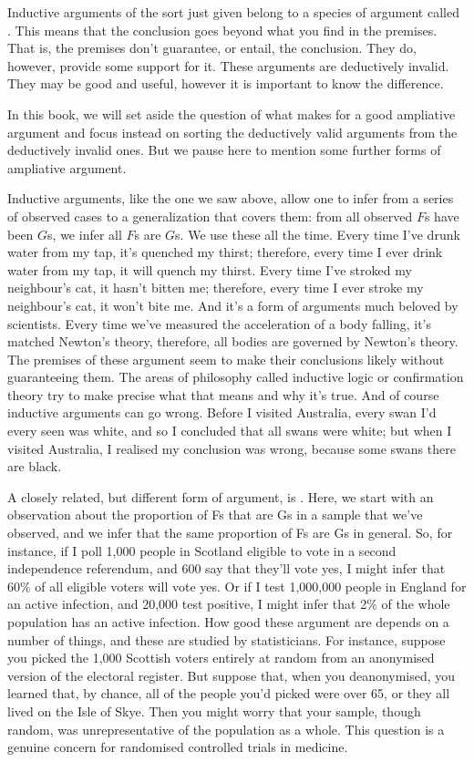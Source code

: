 Inductive arguments of the sort just given belong to a species of argument called . This means that the conclusion goes beyond what you find in the premises. That is, the premises don't guarantee, or entail, the conclusion. They do, however, provide some support for it. These arguments are deductively invalid. They may be good and useful, however it is important to know the difference.

In this book, we will set aside the question of what makes for a good ampliative argument and focus instead on sorting the deductively valid arguments from the deductively invalid ones.
But we pause here to mention some further forms of ampliative argument.

Inductive arguments, like the one we saw above, allow one to infer from a series of observed cases to a generalization that covers them: from all observed $F$s have been $G$s, we infer all $F$s are $G$s. We use these all the time. Every time I've drunk water from my tap, it's quenched my thirst; therefore, every time I ever drink water from my tap, it will quench my thirst. Every time I've stroked my neighbour's cat, it hasn't bitten me; therefore, every time I ever stroke my neighbour's cat, it won't bite me. And it's a form of arguments much beloved by scientists. Every time we've measured the acceleration of a body falling, it's matched Newton's theory, therefore, all bodies are governed by Newton's theory. The premises of these argument seem to make their conclusions likely without guaranteeing them. The areas of philosophy called inductive logic or confirmation theory try to make precise what that means and why it's true. And of course inductive arguments can go wrong. Before I visited Australia, every swan I'd every seen was white, and so I concluded that all swans were white; but when I visited Australia, I realised my conclusion was wrong, because some swans there are black.

A closely related, but different form of argument, is . Here, we start with an observation about the proportion of Fs that are Gs in a sample that we've observed, and we infer that the same proportion of Fs are Gs in general. So, for instance, if I poll 1,000 people in Scotland eligible to vote in a second independence referendum, and 600 say that they'll vote yes, I might infer that 60\% of all eligible voters will vote yes. Or if I test 1,000,000 people in England for an active infection, and 20,000 test positive, I might infer that 2\% of the whole population has an active infection. How good these argument are depends on a number of things, and these are studied by statisticians. For instance, suppose you picked the 1,000 Scottish voters entirely at random from an anonymised version of the electoral register. But suppose that, when you deanonymised, you learned that, by chance, all of the people you'd picked were over 65, or they all lived on the Isle of Skye. Then you might worry that your sample, though random, was unrepresentative of the population as a whole. This question is a genuine concern for randomised controlled trials in medicine.

